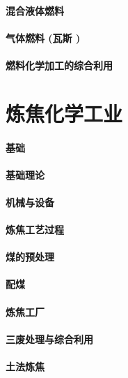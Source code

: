 \documentclass[UTF8]{../../ApplicationUniverse}
\begin{document}
        \subsubsection{混合液体燃料}
    \subsubsection{气体燃料 (瓦斯 )}
\subsubsection{燃料化学加工的综合利用}








\chapter{炼焦化学工业}
\subsubsection{基础}
    \subsubsection{基础理论}
    \subsubsection{机械与设备}
    \subsubsection{炼焦工艺过程}
        \subsubsection{煤的预处理}
        \subsubsection{配煤}
    \subsubsection{炼焦工厂}
    \subsubsection{三废处理与综合利用}
\subsubsection{土法炼焦}
\end{document}
